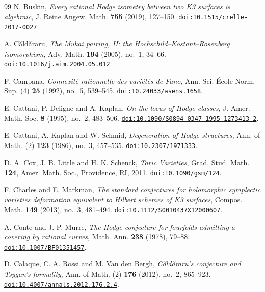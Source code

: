 \begin{thebibliography}{99}
N. Buskin,
\emph{Every rational Hodge isometry between two K3 surfaces is algebraic},
J. Reine Angew. Math. \textbf{755} (2019), 127--150.
\href{https://doi.org/10.1515/crelle-2017-0027}{\texttt{doi:10.1515/crelle-2017-0027}}.

A. C\u{a}ld\u{a}raru,
\emph{The Mukai pairing, II: the Hochschild--Kostant--Rosenberg isomorphism},
Adv. Math. \textbf{194} (2005), no.~1, 34--66.
\href{https://doi.org/10.1016/j.aim.2004.05.012}{\texttt{doi:10.1016/j.aim.2004.05.012}}.

F. Campana,
\emph{Connexit\'e rationnelle des vari\'et\'es de Fano},
Ann. Sci. \'Ecole Norm. Sup. (4) \textbf{25} (1992), no.~5, 539--545.
\href{https://doi.org/10.24033/asens.1658}{\texttt{doi:10.24033/asens.1658}}.

E. Cattani, P. Deligne and A. Kaplan,
\emph{On the locus of Hodge classes},
J. Amer. Math. Soc. \textbf{8} (1995), no.~2, 483--506.
\href{https://doi.org/10.1090/S0894-0347-1995-1273413-2}{\texttt{doi:10.1090/S0894-0347-1995-1273413-2}}.

E. Cattani, A. Kaplan and W. Schmid,
\emph{Degeneration of Hodge structures},
Ann. of Math. (2) \textbf{123} (1986), no.~3, 457--535.
\href{https://doi.org/10.2307/1971333}{\texttt{doi:10.2307/1971333}}.

D. A. Cox, J. B. Little and H. K. Schenck,
\emph{Toric Varieties},
Grad. Stud. Math. \textbf{124}, Amer. Math. Soc., Providence, RI, 2011.
\href{https://doi.org/10.1090/gsm/124}{\texttt{doi:10.1090/gsm/124}}.

F. Charles and E. Markman,
\emph{The standard conjectures for holomorphic symplectic varieties
deformation equivalent to Hilbert schemes of K3 surfaces},
Compos. Math. \textbf{149} (2013), no.~3, 481--494.
\href{https://doi.org/10.1112/S0010437X12000607}{\texttt{doi:10.1112/S0010437X12000607}}.

A. Conte and J. P. Murre,
\emph{The Hodge conjecture for fourfolds admitting a covering by rational
curves},
Math. Ann. \textbf{238} (1978), 79--88.
\href{https://doi.org/10.1007/BF01351457}{\texttt{doi:10.1007/BF01351457}}.

D. Calaque, C. A. Rossi and M. Van den Bergh,
\emph{C\u{a}ld\u{a}raru's conjecture and Tsygan's formality},
Ann. of Math. (2) \textbf{176} (2012), no.~2, 865--923.
\href{https://doi.org/10.4007/annals.2012.176.2.4}{\texttt{doi:10.4007/annals.2012.176.2.4}}.


\end{thebibliography}
